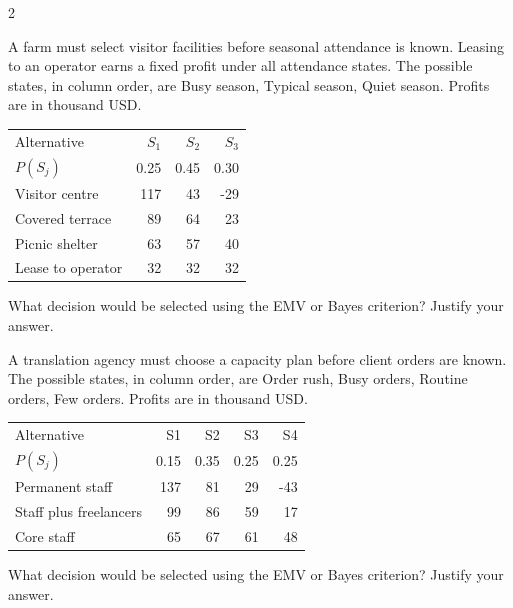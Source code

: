 \begin{multicols}{2}
\begin{minipage}{\linewidth}
A farm must select visitor facilities before seasonal attendance is known. Leasing to an operator earns a fixed profit under all attendance states. The possible states, in column order, are Busy season, Typical season, Quiet season. Profits are in thousand USD.
\begin{center}\small\setlength{\tabcolsep}{4pt}
\begin{tabular}{@{}lrrr@{}}\toprule
Alternative&$S_1$&$S_2$&$S_3$\\
$P(S_j)$&0.25&0.45&0.30\\\midrule
Visitor centre&117&43&-29\\
Covered terrace&89&64&23\\
Picnic shelter&63&57&40\\
Lease to operator&32&32&32\\\bottomrule
\end{tabular}\end{center}

What decision would be selected using the EMV or Bayes criterion? Justify your answer. 
\end{minipage}\par

\begin{minipage}{\linewidth}
A translation agency must choose a capacity plan before client orders are known. The possible states, in column order, are Order rush, Busy orders, Routine orders, Few orders. Profits are in thousand USD.
\begin{center}\small\setlength{\tabcolsep}{4pt}
\begin{tabular}{@{}lrrrr@{}}\toprule
Alternative&S1&S2&S3&S4\\
$P(S_j)$&0.15&0.35&0.25&0.25\\\midrule
Permanent staff&137&81&29&-43\\
Staff plus freelancers&99&86&59&17\\
Core staff&65&67&61&48\\\bottomrule
\end{tabular}\end{center}

What decision would be selected using the EMV or Bayes criterion? Justify your answer. 
\end{minipage}\par



\end{multicols}
